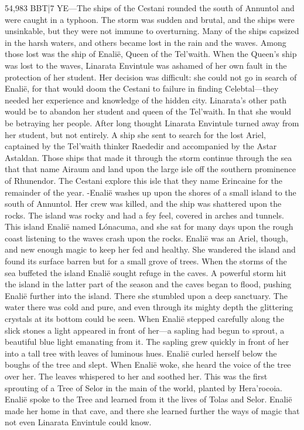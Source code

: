 \documentclass[smalldemyvopaper,11pt,twoside,onecolumn,openright,extrafontsizes]{memoir}
\begin{document}
54,983 BBT|7 YE—The ships of the Cestani rounded the south of Annuntol and were caught in a typhoon. The storm was sudden and brutal, and the ships were unsinkable, but they were not immune to overturning. Many of the ships capsized in the harsh waters, and others became lost in the rain and the waves. Among those lost was the ship of Enalië, Queen of the Tel’waith. When the Queen’s ship was lost to the waves, Linarata Envintule was ashamed of her own fault in the protection of her student. Her decision was difficult: she could not go in search of Enalië, for that would doom the Cestani to failure in finding Celebtal—they needed her experience and knowledge of the hidden city. Linarata’s other path would be to abandon her student and queen of the Tel’waith. In that she would be betraying her people. After long thought Linarata Envintule turned away from her student, but not entirely. A ship she sent to search for the lost Ariel, captained by the Tel’waith thinker Raededir and accompanied by the Astar Astaldan. Those ships that made it through the storm continue through the sea that that name Airaum and land upon the large isle off the southern prominence of Rhunendor. The Cestani explore this isle that they name Erincaine for the remainder of the year.
-Enalië washes up upon the shores of a small island to the south of Annuntol. Her crew was killed, and the ship was shattered upon the rocks. The island was rocky and had a fey feel, covered in arches and tunnels. This island Enalië named Lónacuma, and she sat for many days upon the rough coast listening to the waves crash upon the rocks. Enalië was an Ariel, though, and new enough magic to keep her fed and healthy. She wandered the island and found its surface barren but for a small grove of trees. When the storms of the sea buffeted the island Enalië sought refuge in the caves. A powerful storm hit the island in the latter part of the season and the caves began to flood, pushing Enalië further into the island. There she stumbled upon a deep sanctuary. The water there was cold and pure, and even through its mighty depth the glittering crystals at its bottom could be seen. When Enalië stepped carefully along the slick stones a light appeared in front of her—a sapling had begun to sprout, a beautiful blue light emanating from it. The sapling grew quickly in front of her into a tall tree with leaves of luminous hues. Enalië curled herself below the boughs of the tree and slept. When Enalië woke, she heard the voice of the tree over her. The leaves whispered to her and soothed her. This was the first sprouting of a Tree of Selor in the main of the world, planted by Hera’rocoia. Enalië spoke to the Tree and learned from it the lives of Tolas and Selor. Enalië made her home in that cave, and there she learned further the ways of magic that not even Linarata Envintule could know.
\end{document}
